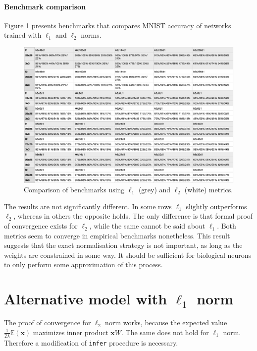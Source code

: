 \documentclass[12pt]{article}
\begin{document}
\paragraph{Benchmark comparison}
Figure \ref{fig:benchmarks_l2} presents benchmarks that compares MNIST accuracy of networks trained with $\ell_1$ and $\ell_2$ norms. 
\begin{figure}[!htbp]
	\centering
	\includegraphics[width=13.8cm]{benchmarks_l2}
	\caption{Comparison of benchmarks using $\ell_1$ (grey) and $\ell_2$ (white) metrics.}
	\label{fig:benchmarks_l2}
\end{figure}
The results are not significantly different. In some rows $\ell_1$ slightly outperforms $\ell_2$, whereas in others the opposite holds. The only difference is that formal proof  of convergence exists for $\ell_2$, while the same cannot be said about $\ell_1$.
Both metrics seem to converge in empirical benchmarks nonetheless. This result suggests that the exact normalisation strategy is not important, as long as the weights are constrained in some way. It should be sufficient for biological neurons to only perform some approximation of this process. 


\section{Alternative model with $\ell_1$ norm}

The proof of convergence for $\ell_2$ norm works, because the expected value $\frac{1}{2 \lambda}\mathbb{E}(\boldsymbol{x})$ maximizes inner product $\boldsymbol{x}W$.
The same does not hold for $\ell_1$ norm. Therefore a modification of \texttt{infer} procedure is necessary.
\end{document}
